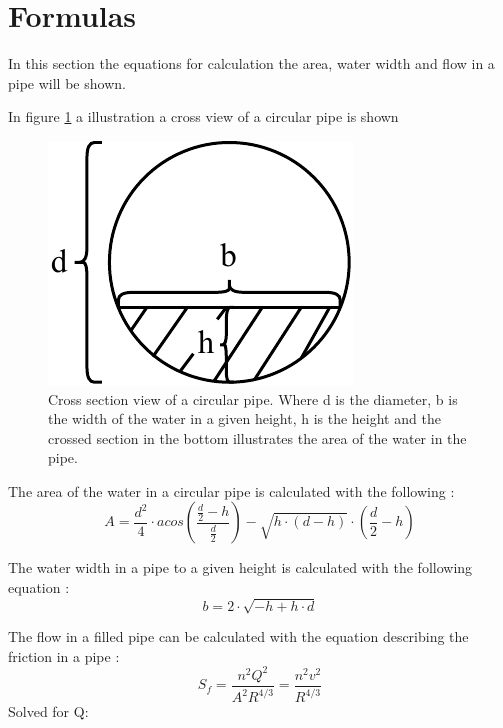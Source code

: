 \newpage
\section{Formulas}\label{app:formulas}
In this section the equations for calculation the area, water width and flow in a pipe will be shown.
%


In figure \ref{fig:calc_water_pipe_width} a illustration a cross view of a circular pipe is shown
\begin{figure}[H]
	\centering
	\includegraphics[width=0.20\textheight]{report/appendix/figures/calc_water_pipe_width.pdf}
	\caption{Cross section view of a circular pipe. Where d is the diameter, b is the width of the water in a given height, h is the height and the crossed section in the bottom illustrates the area of the water in the pipe.}
	\label{fig:calc_water_pipe_width}
\end{figure}

The area of the water in a circular pipe is calculated with the following \cite{ikke_stationear}: 
\begin{equation}%
	A = \frac {d^2}{4} \cdot acos \left(\frac{\frac{d}{2}-h}{\frac{d}{2}}\right)-\sqrt{h\cdot (d-h)}\cdot  \left(\frac{d}{2}-h\right)
\end{equation}

The water width in a pipe to a given height is calculated with the following equation \cite{ikke_stationear}:
\begin{equation}
	b = 2 \cdot \sqrt{-h+h\cdot d}
\end{equation}

The flow in a filled pipe can be calculated with the equation describing the friction in a pipe \cite{ikke_stationear}:
\begin{equation}
	S_f = \frac{n^2 Q^2}{A^2R^{4/3}}= \frac{n^2 v^2}{R^{4/3}}
\label{Manning_formulav2}
\end{equation}
Solved for Q:

